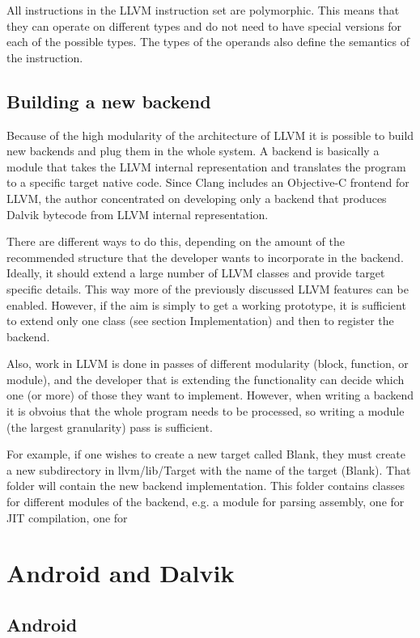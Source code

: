 \documentclass[parskip]{cs4rep}
\begin{document}
All instructions in the LLVM instruction set are polymorphic. This means that they can operate on different types and do not need to have special versions for each of the possible types. The types of the operands also define the semantics of the instruction.

\subsection{Building a new backend}

Because of the high modularity of the architecture of LLVM it is possible to build new backends and plug them in the whole system. A backend is basically a module that takes the LLVM internal representation and translates the program to a specific target native code. Since Clang includes an Objective-C frontend for LLVM, the author concentrated on developing only a backend that produces Dalvik bytecode from LLVM internal representation.

There are different ways to do this, depending on the amount of the recommended structure that the developer wants to incorporate in the backend. Ideally, it should extend a large number of LLVM classes and provide target specific details\cite{P8}. This way more of the previously discussed LLVM features can be enabled. However, if the aim is simply to get a working prototype, it is sufficient to extend only one class (see section Implementation) and then to register the backend.

Also, work in LLVM is done in passes of different modularity (block, function, or module), and the developer that is extending the functionality can decide which one (or more) of those they want to implement. However, when writing a backend it is obvoius that the whole program needs to be processed, so writing a module (the largest granularity) pass is sufficient.

For example, if one wishes to create a new target called Blank, they must create a new subdirectory in llvm/lib/Target with the name of the target (Blank). That folder will contain the new backend implementation. This folder contains classes for different modules of the backend, e.g. a module for parsing assembly, one for JIT compilation, one for   

\section{Android and Dalvik}

\subsection{Android}
\end{document}
